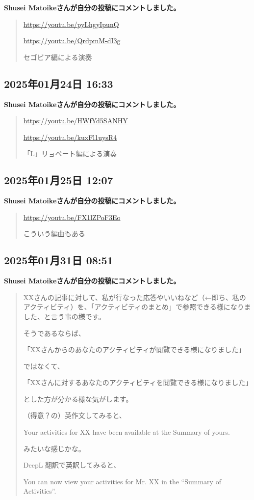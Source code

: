 \textbf{Shusei Matoikeさんが自分の投稿にコメントしました。}

\begin{quote}
\url{https://youtu.be/pyLhgyIpunQ}

\url{https://youtu.be/QrdpmM-dI3g}

セゴビア編による演奏
\end{quote}

\subsection*{2025年01月24日 16:33}

\textbf{Shusei Matoikeさんが自分の投稿にコメントしました。}

\begin{quote}
\url{https://youtu.be/HWfYd5SANHY}

\url{https://youtu.be/kuxFl1uysR4}

「L」リョベート編による演奏
\end{quote}

\subsection*{2025年01月25日 12:07}

\textbf{Shusei Matoikeさんが自分の投稿にコメントしました。}

\begin{quote}
\url{https://youtu.be/FX1lZPoF3Eo}

こういう編曲もある
\end{quote}

\subsection*{2025年01月31日 08:51}

\textbf{Shusei Matoikeさんが自分の投稿にコメントしました。}

\begin{quote}
XXさんの記事に対して、私が行なった応答やいいねなど（←即ち、私のアクティビティ）を、「アクティビティのまとめ」で参照できる様になりました、と言う事の様です。

そうであるならば、

「XXさんからのあなたのアクティビティが閲覧できる様になりました」

ではなくて、

「XXさんに対するあなたのアクティビティを閲覧できる様になりました」

とした方が分かる様な気がします。

（得意？の）英作文してみると、

Your activities for XX have been available at the Summary of yours.

みたいな感じかな。

DeepL 翻訳で英訳してみると、

You can now view your activities for Mr. XX in the “Summary of Activities”.
\end{quote}

